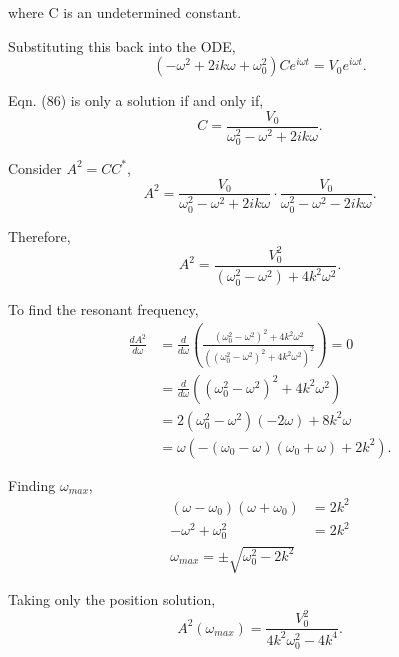 \documentclass{article}
\begin{document}
where C is an undetermined constant.

Substituting this back into the ODE,
\begin{equation}
    (-\omega^2 + 2ik\omega + \omega_0^2)Ce^{i\omega t} = V_0 e^{i \omega t}.
\end{equation}

Eqn. (86) is only a solution if and only if,
\begin{equation}
    C = \frac{V_0}{\omega_0^2 - \omega^2 + 2ik\omega}.
\end{equation}

Consider $A^2 = CC^{*}$,
\begin{equation}
    A^2 = \frac{V_0}{\omega_0^2-\omega^2+2ik\omega}\cdot\frac{V_0}
    {\omega_0^2-\omega^2 - 2ik\omega}.
\end{equation}

Therefore,
\begin{equation}
    A^2 = \frac{V_0^2}{(\omega_0^2-\omega^2)+4k^2\omega^2}.
\end{equation}

To find the resonant frequency, 
\begin{equation}
    \begin{split}
    \frac{dA^2}{d\omega} &= \frac{d}{d\omega}\left(\frac{(\omega_0^2
    -\omega^2)^2+4k^2\omega^2}{\left((\omega_0^2-\omega^2)^2+4k^2\omega^2
    \right)^2}\right) = 0 \\
    &= \frac{d}{d\omega}\left((\omega_0^2-\omega^2)^2+4k^2\omega^2\right) \\
    &=2(\omega_0^2-\omega^2)(-2\omega)+8k^2\omega \\
    &= \omega(-(\omega_0-\omega)(\omega_0+\omega)+2k^2).    
    \end{split}
\end{equation}

Finding $\omega_{max}$,
\begin{equation}
    \begin{split}
        (\omega-\omega_0)(\omega+\omega_0) &= 2k^2 \\
        -\omega^2+\omega_0^2 &= 2k^2 \\
        \omega_{max} = \pm \sqrt{\omega_0^2-2k^2}
    \end{split}
\end{equation}

Taking only the position solution,
\begin{equation}
    A^2(\omega_{max}) = \frac{V_0^2}{4k^2\omega_0^2-4k^4}.
\end{equation}
\end{document}
